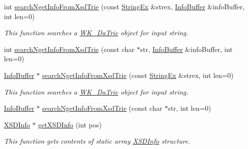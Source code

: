 \begin{CompactItemize}
int \hyperlink{classkmaOrange_1_1PredicativeSuffix_16b885b95dc15ec586a99aa65c74938d}{searchNgetInfoFromXsdTrie} (const \hyperlink{classStringEx}{StringEx} \&strex, \hyperlink{classkmaOrange_1_1InfoBuffer}{InfoBuffer} \&infoBuffer, int len=0)
\begin{CompactList}\small\item\em This function searches a \hyperlink{classkmaOrange_1_1WK__DaTrie}{WK\_\-DaTrie} object for input string. \item\end{CompactList}\item 
int \hyperlink{classkmaOrange_1_1PredicativeSuffix_01937c1f0fb635d343568f2348cb3754}{searchNgetInfoFromXsdTrie} (const char $\ast$str, \hyperlink{classkmaOrange_1_1InfoBuffer}{InfoBuffer} \&infoBuffer, int len=0)
\item 
\hyperlink{classkmaOrange_1_1InfoBuffer}{InfoBuffer} $\ast$ \hyperlink{classkmaOrange_1_1PredicativeSuffix_32a95f75fba6fd1a53f7fe227b71e075}{searchNgetInfoFromXsdTrie} (const \hyperlink{classStringEx}{StringEx} \&strex, int len=0)
\begin{CompactList}\small\item\em This function searches a \hyperlink{classkmaOrange_1_1WK__DaTrie}{WK\_\-DaTrie} object for input string. \item\end{CompactList}\item 
\hyperlink{classkmaOrange_1_1InfoBuffer}{InfoBuffer} $\ast$ \hyperlink{classkmaOrange_1_1PredicativeSuffix_02bfeb30ea922631986bc132b160013e}{searchNgetInfoFromXsdTrie} (const char $\ast$str, int len=0)
\item 
\hyperlink{structkmaOrange_1_1XSDInfo}{XSDInfo} $\ast$ \hyperlink{classkmaOrange_1_1PredicativeSuffix_b1e30cd19e2058472393a95d52939cab}{getXSDInfo} (int pos)
\begin{CompactList}\small\item\em This function gets contents of static array \hyperlink{structkmaOrange_1_1XSDInfo}{XSDInfo} structure. \item\end{CompactList}\end{CompactItemize}
